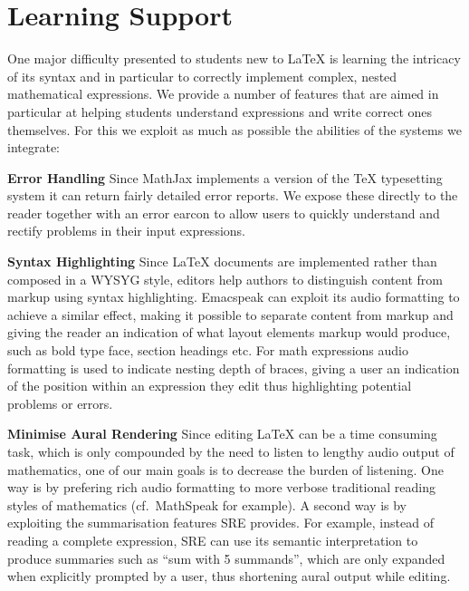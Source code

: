 \documentclass{sig-alternate-05-2015}
\newcommand{\sre}{SRE\xspace}
\begin{document}
\section{Learning Support}
\label{sec:learning-features}

One major difficulty presented to students new to {\LaTeX} is learning the
intricacy of its syntax and in particular to correctly implement complex, nested
mathematical expressions.  We provide a number of features that are aimed in
particular at helping students understand expressions and write correct ones
themselves. For this we exploit as much as possible the abilities of the systems
we integrate:

\textbf{Error Handling} Since MathJax implements a version of the TeX
typesetting system it can return fairly detailed error reports. We expose these
directly to the reader together with an error earcon to allow users to quickly
understand and rectify problems in their input expressions.

\textbf{Syntax Highlighting} Since {\LaTeX} documents are implemented rather
than composed in a WYSYG style, editors help authors to distinguish content from
markup using syntax highlighting. Emacspeak can exploit its audio formatting to
achieve a similar effect, making it possible to separate content from markup and
giving the reader an indication of what layout elements markup would produce,
such as bold type face, section headings etc. For math expressions audio
formatting is used to indicate nesting depth of braces, giving a user an
indication of the position within an expression they edit thus highlighting
potential problems or errors.


\textbf{Minimise Aural Rendering} Since editing {\LaTeX} can be a time consuming
task, which is only compounded by the need to listen to lengthy audio output of
mathematics, one of our main goals is to decrease the burden of listening. One
way is by prefering rich audio formatting to more verbose traditional reading
styles of mathematics (cf.~MathSpeak for example). A second way is by exploiting
the summarisation features \sre provides. For example, instead of reading a
complete expression, \sre can use its semantic interpretation to produce
summaries such as ``sum with 5 summands'', which are only expanded when
explicitly prompted by a user, thus shortening aural output while editing.


\end{document}
